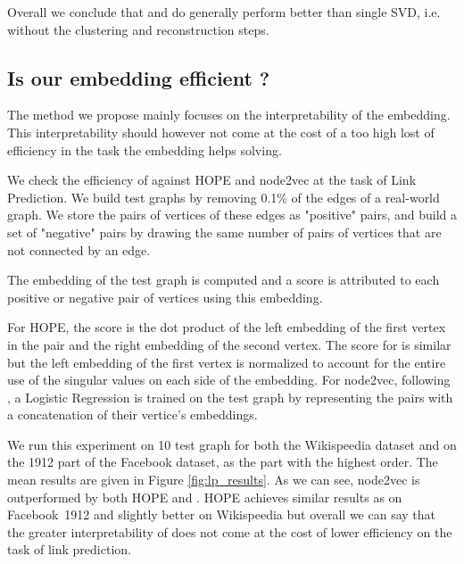 Overall we conclude that \newembLeft and \newembRight do generally perform better than single SVD, i.e. without the clustering and reconstruction steps.

\subsection{Is our embedding efficient ?}
The method we propose mainly focuses on the interpretability of the embedding. This interpretability should however not come at the cost of a too high lost of efficiency in the task the embedding helps solving.

We check the efficiency of \parfaite against HOPE and node2vec at the task of Link Prediction. We build test graphs by removing 0.1\% of the edges of a real-world graph. We store the pairs of vertices of these edges as "positive" pairs, and build a set of "negative" pairs by drawing the same number of pairs of vertices that are not connected by an edge.

The embedding of the test graph is computed and a score is attributed to each positive or negative pair of vertices using this embedding.

For HOPE, the score is the dot product of the left embedding of the first vertex in the pair and the right embedding of the second vertex. The score for \parfaite is similar but the left embedding of the first vertex is normalized to account for the entire use of the singular values on each side of the embedding. For node2vec, following \cite{groverNode2vecScalableFeature2016}, a Logistic Regression is trained on the test graph by representing the pairs with a concatenation of their vertice's embeddings.

We run this experiment on 10 test graph for both the Wikispeedia dataset and on the 1912 part of the Facebook dataset, as the part with the highest order. The mean results are given in Figure \ref{fig:lp_results}. As we can see, node2vec is outperformed by both HOPE and \parfaite. HOPE achieves similar results as \parfaite  on Facebook~1912 and slightly better on Wikispeedia but overall we can say that the greater interpretability of \parfaite does not come at the cost of lower efficiency on the task of link prediction.

